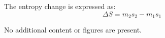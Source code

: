 The entropy change is expressed as:  
\[
\Delta S = m_2 s_2 - m_1 s_1
\]  

No additional content or figures are present.